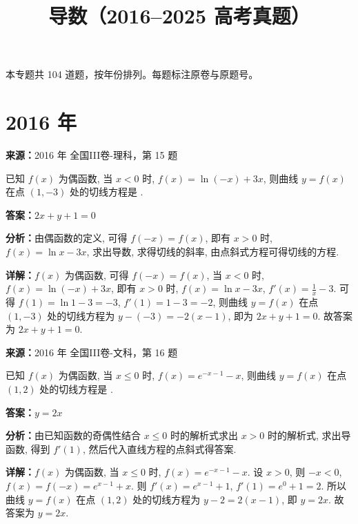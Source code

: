 ﻿\title{导数（2016--2025 高考真题）}
\author{}
\date{}
\maketitle
\noindent 本专题共 104 道题，按年份排列。每题标注原卷与原题号。

\section*{2016 年}

\begin{question}[points=5]
\textbf{来源：}2016 年 全国III卷-理科，第 15 题\par
已知 $f(x)$ 为偶函数, 当 $x<0$ 时, $f(x)=\ln(-x)+3x$, 则曲线 $y=f(x)$ 在点 $(1,-3)$ 处的切线方程是 .
\fillin[{$2x+y+1=0$}]
\begin{solution}
\textbf{答案：}$2x+y+1=0$

\textbf{分析：}由偶函数的定义, 可得 $f(-x)=f(x)$, 即有 $x>0$ 时, $f(x)=\ln x-3x$, 求出导数, 求得切线的斜率, 由点斜式方程可得切线的方程.

\textbf{详解：}$f(x)$ 为偶函数, 可得 $f(-x)=f(x)$, 当 $x<0$ 时, $f(x)=\ln(-x)+3x$, 即有 $x>0$ 时, $f(x)=\ln x-3x$, $f'(x)=\frac{1}{x}-3$. 可得 $f(1)=\ln1-3=-3$, $f'(1)=1-3=-2$, 则曲线 $y=f(x)$ 在点 $(1,-3)$ 处的切线方程为 $y-(-3)=-2(x-1)$, 即为 $2x+y+1=0$. 故答案为 $2x+y+1=0$.
\end{solution}
\end{question}

\begin{question}[points=5]
\textbf{来源：}2016 年 全国III卷-文科，第 16 题\par
已知 $f(x)$ 为偶函数, 当 $x\le 0$ 时, $f(x)=e^{-x-1}-x$, 则曲线 $y=f(x)$ 在点 $(1,2)$ 处的切线方程是 .
\fillin[{$y=2x$}]
\begin{solution}
\textbf{答案：}$y=2x$

\textbf{分析：}由已知函数的奇偶性结合 $x\le 0$ 时的解析式求出 $x>0$ 时的解析式, 求出导函数, 得到 $f'(1)$, 然后代入直线方程的点斜式得答案.

\textbf{详解：}$f(x)$ 为偶函数, 当 $x\le 0$ 时, $f(x)=e^{-x-1}-x$. 设 $x>0$, 则 $-x<0$, $f(x)=f(-x)=e^{x-1}+x$. 则 $f'(x)=e^{x-1}+1$, $f'(1)=e^0+1=2$. 所以曲线 $y=f(x)$ 在点 $(1,2)$ 处的切线方程为 $y-2=2(x-1)$, 即 $y=2x$. 故答案为 $y=2x$.
\end{solution}
\end{question}

